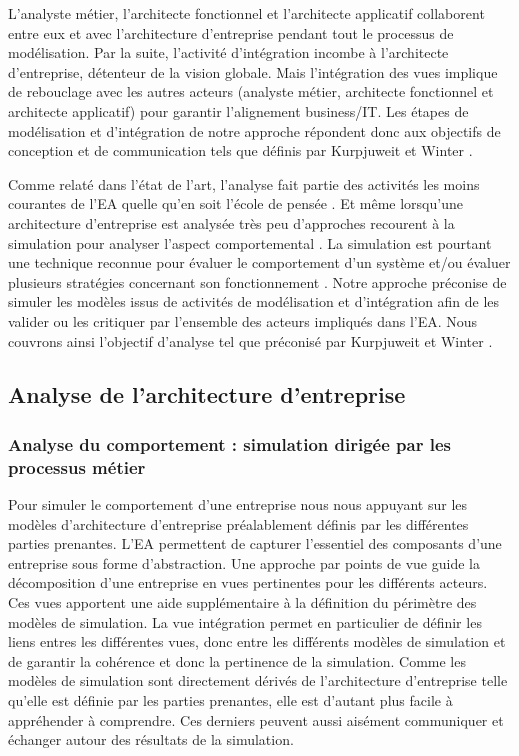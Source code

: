 L'analyste métier, l'architecte fonctionnel et l'architecte applicatif
collaborent entre eux et avec l'architecture d'entreprise pendant tout le
processus de modélisation. Par la suite, l'activité d'intégration incombe à
l'architecte d'entreprise, détenteur de la vision globale. Mais l'intégration
des vues implique de rebouclage avec les autres acteurs (analyste métier,
architecte fonctionnel et architecte applicatif) pour garantir l'alignement
business/IT. Les étapes de modélisation et d'intégration de notre approche
répondent donc aux objectifs de conception et de communication tels que définis
par Kurpjuweit et Winter \cite{kurpjuweit2007viewpoint}.

Comme relaté dans l'état de l'art, l'analyse fait partie des activités les moins
courantes de l'EA quelle qu'en soit l'école de pensée
\cite{chen2008architectures} \cite{barn2013enterprise}. Et même lorsqu'une
architecture d'entreprise est analysée très peu d'approches recourent à la
simulation pour analyser l'aspect comportemental \cite{glazner2011enterprise}
\cite{manzur2015xarchimate}. La simulation est pourtant une technique reconnue
pour évaluer le comportement d'un système et/ou évaluer plusieurs stratégies
concernant son fonctionnement \cite{shannon1975systems}. Notre approche
préconise de simuler les modèles issus de activités de modélisation et
d'intégration afin de les valider ou les critiquer par l'ensemble des acteurs
impliqués dans l'EA. Nous couvrons ainsi l'objectif d'analyse tel que préconisé
par Kurpjuweit et Winter \cite{kurpjuweit2007viewpoint}.


    \subsection{Analyse de l'architecture d'entreprise}

        \subsubsection{Analyse du comportement : simulation dirigée par les processus
métier}

Pour simuler le comportement d'une entreprise nous nous appuyant sur les modèles
d'architecture d'entreprise préalablement définis par les différentes parties
prenantes. L'EA permettent de capturer l'essentiel des composants d'une
entreprise sous forme d'abstraction. Une approche par points de vue guide la
décomposition d'une entreprise en vues pertinentes pour les différents acteurs.
Ces vues apportent une aide supplémentaire à la définition du périmètre des
modèles de simulation. La vue intégration permet en particulier de définir les
liens entres les différentes vues, donc entre les différents modèles de
simulation et de garantir la cohérence et donc la pertinence de la simulation.
Comme les modèles de simulation sont directement dérivés de l'architecture
d'entreprise telle qu'elle est définie par les parties prenantes, elle est
d'autant plus facile à appréhender à comprendre. Ces derniers peuvent aussi
aisément communiquer et échanger autour des résultats de la simulation.

